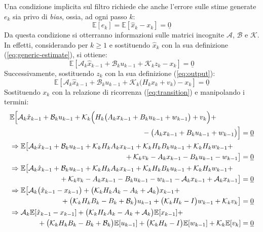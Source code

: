 \documentclass[12pt,a4paper,openright,twoside]{book}
\begin{document}
Una condizione implicita sul filtro richiede che anche l'errore sulle stime generate $e_k$ sia privo di \textit{bias}, ossia, ad ogni passo $k$:
$$\mathbb{E}[e_k]=\mathbb{E}[\hat{x}_k-x_k]=\underline{0}$$
Da questa condizione si otterranno informazioni sulle matrici incognite $\mathcal{A}$, $\mathcal{B}$ e $\mathcal{K}$. In effetti, considerando per $k\geq 1$ e sostituendo $\hat{x}_k$ con la sua definizione (\ref{eq:generic-estimate}), si ottiene:
$$\mathbb{E}[\mathcal{A}_k\hat{x}_{k-1}+\mathcal{B}_ku_{k-1}+\mathcal{K}_kz_k-x_k]=\underline{0}$$
Successivamente, sostituendo $z_k$ con la sua definizione (\ref{eq:output}):
$$\mathbb{E}\left[\mathcal{A}_k\hat{x}_{k-1}+\mathcal{B}_ku_{k-1}+\mathcal{K}_k\bigl(H_kx_k+v_k\bigr)-x_k\right]=\underline{0}$$
Sostituendo $x_k$ con la relazione di ricorrenza (\ref{eq:transition}) e manipolando i termini:
\begin{gather*}
\begin{multlined}[\textwidth]
\mathbb{E}\Bigl[\mathcal{A}_k\hat{x}_{k-1}+\mathcal{B}_ku_{k-1}+\mathcal{K}_k\Bigl(H_k\bigl(A_kx_{k-1}+B_ku_{k-1}+w_{k-1}\bigr)+v_k\Bigr)+ \\
-\bigl(A_kx_{k-1}+B_ku_{k-1}+w_{k-1}\bigr)\Bigr]=\underline{0}
\end{multlined} \\
\begin{multlined}[\textwidth]
\Rightarrow\mathbb{E}\bigl[\mathcal{A}_k\hat{x}_{k-1}+\mathcal{B}_ku_{k-1}+\mathcal{K}_kH_kA_kx_{k-1}+\mathcal{K}_kH_kB_ku_{k-1}+\mathcal{K}_kH_kw_{k-1}+ \\
+\mathcal{K}_kv_k-A_kx_{k-1}-B_ku_{k-1}-w_{k-1}\bigr]=\underline{0}
\end{multlined} \\
\begin{multlined}[\textwidth]
\Rightarrow\mathbb{E}\bigl[\mathcal{A}_k\hat{x}_{k-1}+\mathcal{B}_ku_{k-1}+\mathcal{K}_kH_kA_kx_{k-1}+\mathcal{K}_kH_kB_ku_{k-1}+\mathcal{K}_kH_kw_{k-1}+ \\
+\mathcal{K}_kv_k-A_kx_{k-1}-B_ku_{k-1}-w_{k-1}-\mathcal{A}_kx_{k-1}+\mathcal{A}_kx_{k-1}\bigr]=\underline{0}
\end{multlined} \\
\begin{multlined}[\textwidth]
\Rightarrow\mathbb{E}\bigl[\mathcal{A}_k\bigl(\hat{x}_{k-1}-x_{k-1}\bigr)+\bigl(\mathcal{K}_kH_kA_k-A_k+\mathcal{A}_k\bigr)x_{k-1}+ \\
+\bigl(\mathcal{K}_kH_kB_k-B_k+\mathcal{B}_k\bigr)u_{k-1}+\bigl(\mathcal{K}_kH_k-I\bigr)w_{k-1}+\mathcal{K}_kv_k\bigr]=\underline{0}
\end{multlined} \\
\begin{multlined}[\textwidth]
\Rightarrow\mathcal{A}_k\mathbb{E}[\hat{x}_{k-1}-x_{k-1}]+\bigl(\mathcal{K}_kH_kA_k-A_k+\mathcal{A}_k\bigr)\mathbb{E}[x_{k-1}]+ \\
+\bigl(\mathcal{K}_kH_kB_k-B_k+\mathcal{B}_k\bigr)\mathbb{E}[u_{k-1}]+\bigl(\mathcal{K}_kH_k-I\bigr)\mathbb{E}[w_{k-1}]+\mathcal{K}_k\mathbb{E}[v_k]=\underline{0}
\end{multlined}
\end{gather*}
\end{document}
